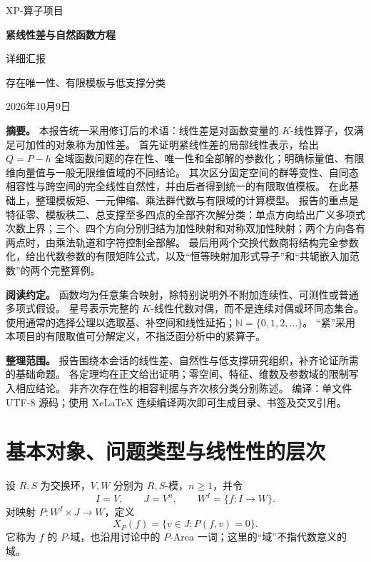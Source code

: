 \documentclass[UTF8,11pt,a4paper]{ctexart}
\theoremstyle{definition}
\newcommand{\N}{\mathbb N}
\numberwithin{equation}{section}
\begin{document}
\begin{titlepage}
\vspace*{16mm}
{\small\color{MidnightBlue} XP-算子项目\par}
\vspace{8mm}
{\LARGE\bfseries 紧线性差与自然函数方程\par}
\vspace{5mm}
{\Large 详细汇报\par}
\vspace{8mm}
{\large 存在唯一性、有限模板与低支撑分类\par}
\vspace{10mm}
{\normalsize 2026年10月9日\par}
\vspace{10mm}
\noindent\textbf{摘要。}
本报告统一采用修订后的术语：线性差是对函数变量的 $K$-线性算子，仅满足可加性的对象称为加性差。
首先证明紧线性差的局部线性表示，给出 $Q=P-h$ 全域函数问题的存在性、唯一性和全部解的参数化；明确标量值、有限维向量值与一般无限维值域的不同结论。
其次区分固定空间的群等变性、自同态相容性与跨空间的完全线性自然性，并由后者得到统一的有限取值模板。
在此基础上，整理模板矩、一元伸缩、乘法群代数与有限域的计算模型。
报告的重点是特征零、模板秩二、总支撑至多四点的全部齐次解分类：单点方向给出广义多项式次数上界；三个、四个方向分别归结为加性映射和对称双加性映射；两个方向各有两点时，由乘法轨道和字符控制全部解。
最后用两个交换代数商将结构完全参数化，给出代数参数的有限矩阵公式，以及“恒等映射加形式导子”和“共轭嵌入加范数”的两个完整算例。

\medskip
\noindent\textbf{阅读约定。}
函数均为任意集合映射，除特别说明外不附加连续性、可测性或普通多项式假设。
星号表示完整的 $K$-线性代数对偶，而不是连续对偶或环同态集合。
使用通常的选择公理以选取基、补空间和线性延拓；$\N=\{0,1,2,\ldots\}$。
“紧”采用本项目的有限取值可分解定义，不指泛函分析中的紧算子。

\medskip
\noindent\textbf{整理范围。}
报告围绕本会话的线性差、自然性与低支撑研究组织，补齐论证所需的基础命题。
各定理均在正文给出证明；零空间、特征、维数及参数域的限制写入相应结论。
非齐次存在性的相容判据与齐次核分类分别陈述。
\vfill
\noindent\small 编译：单文件 UTF-8 源码；使用 XeLaTeX 连续编译两次即可生成目录、书签及交叉引用。
\end{titlepage}
\setcounter{tocdepth}{1}
\begingroup
\normalsize
\setlength{\parskip}{0pt}
\tableofcontents
\endgroup
\clearpage
{}
\section{基本对象、问题类型与线性性的层次}
设 $R,S$ 为交换环，$V,W$ 分别为 $R,S$-模，$n\ge1$，并令
\[
 I=V,\qquad J=V^n,\qquad W^I=\{f:I\to W\}.
\]
对映射 $P:W^I\times J\to W$，定义
\[
 X_P(f)=\{v\in J:P(f,v)=0\}.
\]
它称为 $f$ 的 $P$-域，也沿用讨论中的 $P$-Area 一词；这里的“域”不指代数意义的域。
\end{document}
